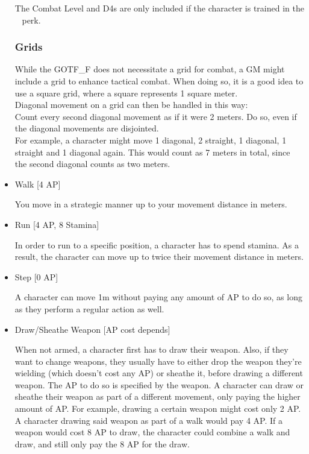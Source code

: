 \begin{itemize}
The Combat Level and D4s are only included if the character is trained in the ~ perk.\\

\subsubsection{Grids}

While the GOTF\_F does not necessitate a grid for combat, a GM might include a grid to enhance tactical combat.
When doing so, it is a good idea to use a square grid, where a square represents 1 square meter.\\
Diagonal movement on a grid can then be handled in this way:\\
Count every second diagonal movement as if it were 2 meters.
Do so, even if the diagonal movements are disjointed.\\
For example, a character might move 1 diagonal, 2 straight, 1 diagonal, 1 straight and 1 diagonal again.
This would count as 7 meters in total, since the second diagonal counts as two meters.

\item Walk [4 AP]

You move in a strategic manner up to your movement distance in meters.

\item Run [4 AP, 8 Stamina]

In order to run to a specific position, a character has to spend stamina.
As a result, the character can move up to twice their movement distance in meters.

\item Step [0 AP]

A character can move 1m without paying any amount of AP to do so, as long as they perform a regular action as well.

\item Draw/Sheathe Weapon [AP cost depends]

When not armed, a character first has to draw their weapon.
Also, if they want to change weapons, they usually have to either drop the weapon they're wielding (which doesn't cost any AP) or sheathe it, before drawing a different weapon.
The AP to do so is specified by the weapon.
A character can draw or sheathe their weapon as part of a different movement, only paying the higher amount of AP.
For example, drawing a certain weapon might cost only 2 AP.
A character drawing said weapon as part of a walk would pay 4 AP.
If a weapon would cost 8 AP to draw, the character could combine a walk and draw, and still only pay the 8 AP for the draw.
\end{itemize}